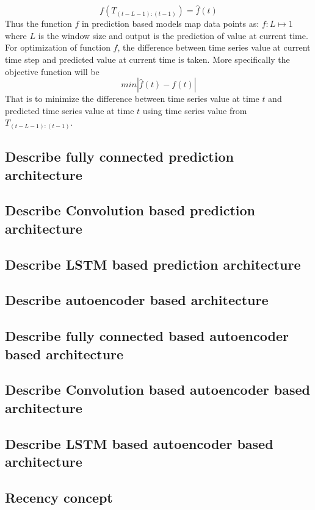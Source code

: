 \documentclass[12pt]{article}
\begin{document}
\begin{equation}
f(T_{(t-L-1):(t-1)}) = \hat{f}(t)
\end{equation} 
Thus the function $f$ in prediction based models map data points as: $f: L \mapsto 1$ where $L$ is the window size and output is the prediction of value at current time. For optimization of function $f$, the difference between time series value at current time step and predicted value at current time is taken. More specifically the objective function will be
\begin{equation}
min |\hat{f}(t) - f(t)|
\end{equation}
That is to minimize the difference between time series value at time $t$ and predicted time series value at time $t$ using time series value from $T_{(t-L-1):(t-1)}$.
\subsection{Describe fully connected prediction architecture}
\subsection{Describe Convolution based prediction architecture}

\subsection{Describe LSTM based prediction architecture}

\subsection{Describe autoencoder based architecture}
\subsection{Describe fully connected based autoencoder based architecture}
\subsection{Describe Convolution based autoencoder based architecture}
\subsection{Describe LSTM based autoencoder based architecture}
\subsection{Recency concept}
\end{document}
